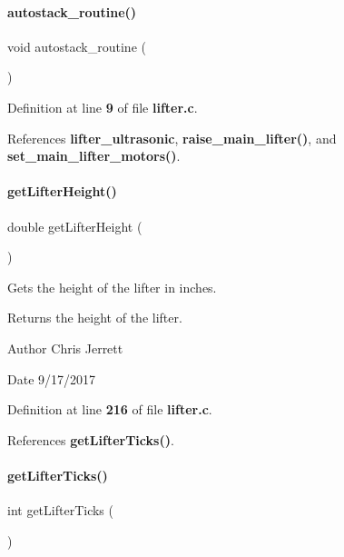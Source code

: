 \paragraph{autostack\+\_\+routine()}
{\footnotesize\ttfamily void autostack\+\_\+routine (\begin{DoxyParamCaption}{ }\end{DoxyParamCaption})}



Definition at line \textbf{ 9} of file \textbf{ lifter.\+c}.



References \textbf{ lifter\+\_\+ultrasonic}, \textbf{ raise\+\_\+main\+\_\+lifter()}, and \textbf{ set\+\_\+main\+\_\+lifter\+\_\+motors()}.

\mbox{\label{lifter_8c_a2719740958fd8a5926f88f6194e820e3}} 
\paragraph{get\+Lifter\+Height()}
{\footnotesize\ttfamily double get\+Lifter\+Height (\begin{DoxyParamCaption}{ }\end{DoxyParamCaption})}



Gets the height of the lifter in inches. 

\begin{DoxyReturn}{Returns}
the height of the lifter. 
\end{DoxyReturn}
\begin{DoxyAuthor}{Author}
Chris Jerrett 
\end{DoxyAuthor}
\begin{DoxyDate}{Date}
9/17/2017 
\end{DoxyDate}


Definition at line \textbf{ 216} of file \textbf{ lifter.\+c}.



References \textbf{ get\+Lifter\+Ticks()}.

\mbox{\label{lifter_8c_acdf909159b0406c48099843f2306be78}} 
\paragraph{get\+Lifter\+Ticks()}
{\footnotesize\ttfamily int get\+Lifter\+Ticks (\begin{DoxyParamCaption}{ }\end{DoxyParamCaption})}



